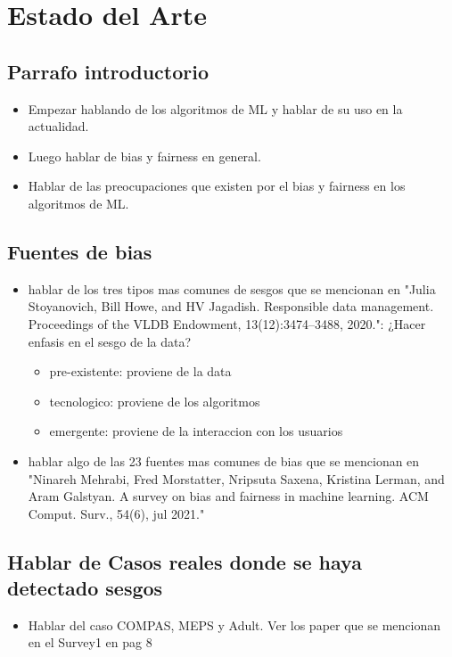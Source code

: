\chapter{Estado del Arte}\label{chapter:state-of-the-art}

\section{Parrafo introductorio}
\begin{itemize}
    \item Empezar hablando de los algoritmos de ML y hablar de su uso en la actualidad.
    \item Luego hablar de bias y fairness en general.
    \item Hablar de las preocupaciones que existen por el bias y fairness en los algoritmos de ML.
\end{itemize}

\section{Fuentes de bias}
\begin{itemize}
    \item hablar de los tres tipos mas comunes de sesgos que se mencionan en "Julia Stoyanovich, Bill Howe, and HV Jagadish. Responsible data management. Proceedings of the VLDB
    Endowment, 13(12):3474–3488, 2020.": ¿Hacer enfasis en el sesgo de la data?
    \begin{itemize}
        \item pre-existente: proviene de la data
        \item tecnologico: proviene de los algoritmos
        \item emergente: proviene de la interaccion con los usuarios
    \end{itemize}
    \item hablar algo de las 23 fuentes mas comunes de bias 
    que se mencionan en "Ninareh Mehrabi, Fred Morstatter, Nripsuta Saxena, Kristina Lerman, and Aram Galstyan. A survey on bias and
    fairness in machine learning. ACM Comput. Surv., 54(6), jul 2021."
\end{itemize}

\section{Hablar de Casos reales donde se haya detectado sesgos}

    \begin{itemize}
        \item Hablar del caso COMPAS, MEPS y Adult. Ver los paper que se mencionan en el Survey1 en pag 8
    \end{itemize}


